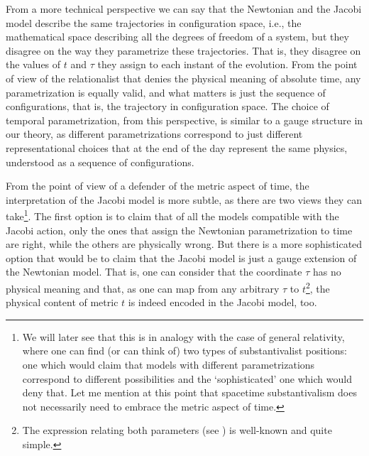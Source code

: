 \documentclass[12 pt]{article}
\begin{document}
From a more technical perspective we can say that the Newtonian and the Jacobi model describe the same trajectories in configuration space, i.e., the mathematical space describing all the degrees of freedom of a system, but they disagree on the way they parametrize these trajectories. That is, they disagree on the values of $t$ and $\tau$ they assign to each instant of the evolution. From the point of view of the relationalist that denies the physical meaning of absolute time, any parametrization is equally valid, and what matters is just the sequence of configurations, that is, the trajectory in configuration space. The choice of temporal parametrization, from this perspective, is similar to a gauge structure in our theory, as different parametrizations correspond to just different representational choices that at the end of the day represent the same physics, understood as a sequence of configurations.

From the point of view of a defender of the metric aspect of time, the interpretation of the Jacobi model is more subtle, as there are two views they can take\footnote{We will later see that this is in analogy with the case of general relativity, where one can find (or can think of) two types of substantivalist positions: one which would claim that models with different parametrizations correspond to different possibilities and the `sophisticated' one which would deny that. Let me mention at this point that spacetime substantivalism does not necessarily need to embrace the metric aspect of time.}. The first option is to claim that of all the models compatible with the Jacobi action, only the ones that assign the Newtonian parametrization to time are right, while the others are physically wrong. But there is a more sophisticated option that would be to claim that the Jacobi model is just a gauge extension of the Newtonian model. That is, one can consider that the coordinate $\tau$ has no physical meaning and that, as one can map from any arbitrary $\tau$ to $t$\footnote{The expression relating both parameters (see \citep{Barbour1994}) is well-known and quite simple.}, the physical content of metric $t$ is indeed encoded in the Jacobi model, too. 
\end{document}
